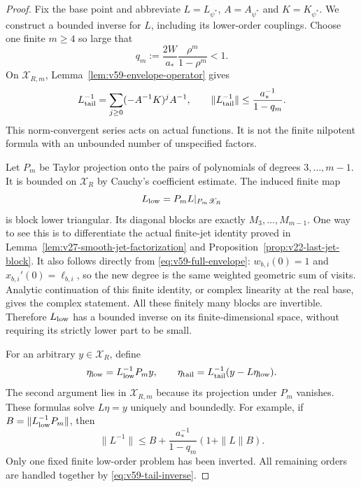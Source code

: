 \begin{proof}
Fix the base point and abbreviate $L=L_{\psi^*}$, $A=A_{\psi^*}$ and
$K=K_{\psi^*}$.  We construct a bounded inverse for $L$, including its
lower-order couplings.  Choose one finite $m\ge4$ so large that
\begin{equation}\label{eq:v59-tail-choice}
                q_m:=\frac{2W}{a_*}\frac{\rho^m}{1-\rho^m}<1.
\end{equation}
On $\mathscr X_{R,m}$, Lemma~\ref{lem:v59-envelope-operator} gives
\begin{equation}\label{eq:v59-tail-inverse}
 L_{\rm tail}^{-1}
      =\sum_{j\ge0}(-A^{-1}K)^jA^{-1},\qquad
 \|L_{\rm tail}^{-1}\|\le\frac{a_*^{-1}}{1-q_m}.
\end{equation}
This norm-convergent series acts on actual functions.  It is not the
finite nilpotent formula with an unbounded number of unspecified factors.

Let $P_m$ be Taylor projection onto the pairs of polynomials of degrees
$3,\ldots,m-1$.  It is bounded on $\mathscr X_R$ by Cauchy's
coefficient estimate.  The induced finite map
\[
       L_{\rm low}=P_mL|_{P_m\mathscr X_R}
\]
is block lower triangular.  Its diagonal blocks are exactly
$M_3,\ldots,M_{m-1}$.  One way to see this is to differentiate the
actual finite-jet identity proved in
Lemma~\ref{lem:v27-smooth-jet-factorization} and
Proposition~\ref{prop:v22-last-jet-block}.  It also follows directly
from \eqref{eq:v59-full-envelope}: $w_{b,i}(0)=1$ and
$x_{b,i}'(0)=\ell_{b,i}$, so the new degree is the same weighted
geometric sum of visits.  Analytic continuation of this finite identity,
or complex linearity at the real base, gives the complex statement.
All these finitely many blocks are invertible.  Therefore $L_{\rm low}$
has a bounded inverse on its finite-dimensional space, without requiring
its strictly lower part to be small.

For an arbitrary $y\in\mathscr X_R$, define
\begin{equation}\label{eq:v59-full-linear-inverse}
 \eta_{\rm low}=L_{\rm low}^{-1}P_my,\qquad
 \eta_{\rm tail}=L_{\rm tail}^{-1}(y-L\eta_{\rm low}).
\end{equation}
The second argument lies in $\mathscr X_{R,m}$ because its projection
under $P_m$ vanishes.  These formulas solve $L\eta=y$ uniquely and
boundedly.  For example, if $B=\|L_{\rm low}^{-1}P_m\|$, then
\begin{equation}\label{eq:v59-complete-operator-bound}
 \|L^{-1}\|\le B+\frac{a_*^{-1}}{1-q_m}(1+\|L\|B).
\end{equation}
Only one fixed finite low-order problem has been inverted.  All remaining
orders are handled together by \eqref{eq:v59-tail-inverse}.


\end{proof}
